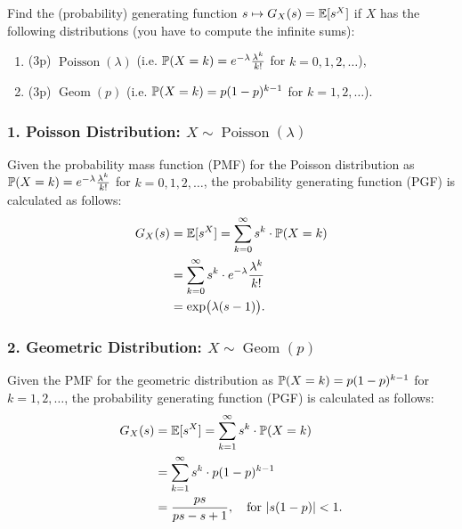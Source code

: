 \begin{problem}
	Find the (probability) generating function $s\mapsto G_X(s) = \mathbb{E}[s^X]$ if
	$X$ has the following distributions (you have to compute the infinite sums):
	\begin{enumerate}
		\item (3p) $\operatorname{Poisson}(\lambda)$ \quad (i.e. $\mathbb{P}(X=k) = e^{-\lambda}\frac{\lambda^k}
		{k!}$ for $k=0,1,2,\dots$),
		\item (3p) $\operatorname{Geom}(p)$ \quad (i.e. $\mathbb{P}(X=k) = p(1-p)^{k-1}$ for $k=1,2,\dots$).
	\end{enumerate}
\end{problem}

\begin{solution}
	\subsubsection*{1. Poisson Distribution: \(X \sim \operatorname{Poisson}(\lambda)\)}
	Given the probability mass function (PMF) for the Poisson distribution as \(\mathbb{P}(X=k) = e^{-\lambda}\frac{\lambda^k}{k!}\) for \(k=0,1,2,\dots\), the probability generating function (PGF) is calculated as follows:
	\begin{align*}
		G_X(s) &= \mathbb{E}[s^X] = \sum_{k=0}^{\infty} s^k \cdot \mathbb{P}(X=k) \\
		&= \sum_{k=0}^{\infty} s^k \cdot e^{-\lambda}\frac{\lambda^k}{k!} \\
		&= \exp(\lambda(s - 1)).
	\end{align*}
	
	\subsubsection*{2. Geometric Distribution: \(X \sim \operatorname{Geom}(p)\)}
	Given the PMF for the geometric distribution as \(\mathbb{P}(X=k) = p(1-p)^{k-1}\) for \(k=1,2,\dots\), the probability generating function (PGF) is calculated as follows:
	\begin{align*}
		G_X(s) &= \mathbb{E}[s^X] = \sum_{k=1}^{\infty} s^k \cdot \mathbb{P}(X=k) \\
		&= \sum_{k=1}^{\infty} s^k \cdot p(1-p)^{k-1} \\
		&= \frac{ps}{ps - s + 1}, \quad \text{for } |s(1-p)| < 1.
	\end{align*}
	
\end{solution}


